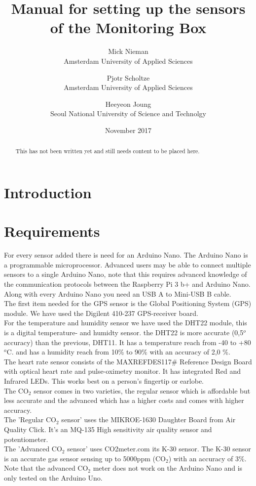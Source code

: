 \documentclass{report}
\title{Manual for setting up the sensors of the Monitoring Box}
\author{Mick Nieman \\ Amsterdam University of Applied Sciences \and Pjotr Scholtze \\ Amsterdam University of Applied Sciences \and Heeyeon Joung \\ Seoul National University of Science and Technolgy}
\date{November 2017}
\begin{document}
\maketitle
\begin{abstract}
This has not been written yet and still needs content to be placed here. 
\end{abstract}

\tableofcontents

\chapter{Introduction}

\chapter{Requirements}
For every sensor added there is need for an Arduino Nano. The Arduino Nano is a programmable microprocessor. Advanced users may be able to connect multiple sensors to a single Arduino Nano, note that this requires advanced knowledge of the communication protocols between the Raspberry Pi 3 b+ and Arduino Nano. Along with every Arduino Nano you need an USB A to Mini-USB B cable.  \\

The first item needed for the GPS sensor is the Global Positioning System (GPS) module. We have used the Digilent 410-237 GPS-receiver board. \\

For the temperature and humidity sensor we have used the DHT22 module, this is a digital temperature- and humidty sensor. the DHT22 is more accurate (0,5$^o$ accuracy) than the previous, DHT11. It has a temperature reach from -40 to +80 $^o$C. and has a humidity reach from 10\% to 90\% with an accuracy of 2,0 \%.  \\

The heart rate sensor consists of the MAXREFDES117\# Reference Design Board with optical heart rate and pulse-oximetry monitor. It has integrated Red and Infrared LEDs. This works best on a person's fingertip or earlobe. \\

The CO$_2$ sensor comes in two varieties, the regular sensor which is affordable but less accurate and the advanced which has a higher costs and comes with higher accuracy. \\
The 'Regular CO$_2$ sensor' uses the MIKROE-1630 Daughter Board from Air Quality Click. It's an MQ-135 High sensitivity air quality sensor and potentiometer. \\
The 'Advanced CO$_2$ sensor' uses CO2meter.com its K-30 sensor. The K-30 sensor is an accurate gas sensor sensing up to 5000ppm (CO$_2$) with an accuracy of 3\%. Note that the advanced CO$_2$ meter does not work on the Arduino Nano and is only tested on the Arduino Uno. \\
\end{document}
